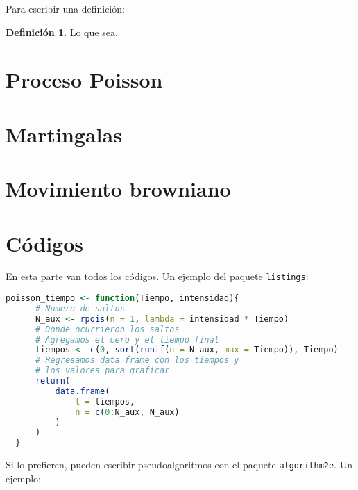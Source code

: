 \documentclass[
letterpaper,
11pt, %
oneside,
onecolumn, %
article
]{memoir}
\theoremstyle{plain}
\theoremstyle{definition}
\newtheorem{definition}[theorem]{Definici\'on}
\theoremstyle{remark}
\begin{document}
Para escribir una definición:

\begin{definition}
    Lo que sea.
\end{definition}

\newpage

\chapter*{Proceso Poisson}


\newpage

\chapter*{Martingalas}


\newpage

\chapter*{Movimiento browniano}


\newpage

\appendix
{}

\chapter{Códigos}

\noindent En esta parte van todos los códigos. Un ejemplo del paquete \texttt{listings}:

\begin{lstlisting}[language=R]
  poisson_tiempo <- function(Tiempo, intensidad){
      # Numero de saltos
      N_aux <- rpois(n = 1, lambda = intensidad * Tiempo)
      # Donde ocurrieron los saltos
      # Agregamos el cero y el tiempo final
      tiempos <- c(0, sort(runif(n = N_aux, max = Tiempo)), Tiempo)
      # Regresamos data frame con los tiempos y 
      # los valores para graficar
      return(
          data.frame(
              t = tiempos,
              n = c(0:N_aux, N_aux)
          )
      )
  }
\end{lstlisting}

Si lo prefieren, pueden escribir pseudoalgoritmos con el paquete \texttt{algorithm2e}. Un ejemplo:
\end{document}
